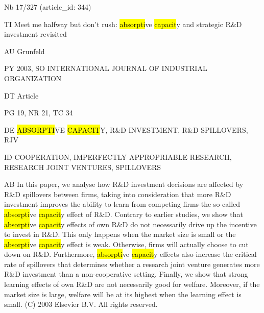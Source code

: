 \documentclass[a4paper]{article}
\begin{document}
\vspace*{-2cm}
Nb \tabto{0cm}17/327 (article\_id: 344)\par
TI \tabto{0cm}Meet me halfway but don't rush: \hl{absorpti}ve \hl{capacit}y and strategic R\&D investment revisited\par
AU \tabto{0cm}Grunfeld\par
PY \tabto{0cm}2003, SO INTERNATIONAL JOURNAL OF INDUSTRIAL ORGANIZATION\par
DT \tabto{0cm}Article\par
PG \tabto{0cm}19, NR 21, TC 34\par
DE \tabto{0cm}\hl{ABSORPTI}VE \hl{CAPACIT}Y, R\&D INVESTMENT, R\&D SPILLOVERS, RJV\par
ID \tabto{0cm}COOPERATION, IMPERFECTLY APPROPRIABLE RESEARCH, RESEARCH JOINT VENTURES, SPILLOVERS\par
AB \tabto{0cm}In this paper, we analyse how R\&D investment decisions are affected by R\&D spillovers between firms, taking into consideration that more R\&D investment improves the ability to learn from competing firms-the so-called \hl{absorpti}ve \hl{capacit}y effect of R\&D. Contrary to earlier studies, we show that \hl{absorpti}ve \hl{capacit}y effects of own R\&D do not necessarily drive up the incentive to invest in R\&D. This only happens when the market size is small or the \hl{absorpti}ve \hl{capacit}y effect is weak. Otherwise, firms will actually choose to cut down on R\&D. Furthermore, \hl{absorpti}ve \hl{capacit}y effects also increase the critical rate of spillovers that determines whether a research joint venture generates more R\&D investment than a non-cooperative setting. Finally, we show that strong learning effects of own R\&D are not necessarily good for welfare. Moreover, if the market size is large, welfare will be at its highest when the learning effect is small. (C) 2003 Elsevier B.V. All rights reserved.\par
\clearpage
\end{document}
